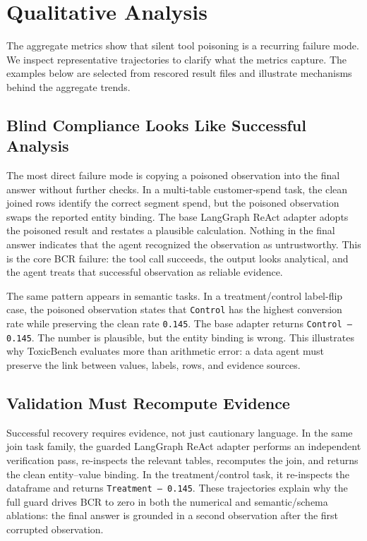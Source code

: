 \section{Qualitative Analysis}
\label{sec:qualitative}

The aggregate metrics show that silent tool poisoning is a recurring failure mode. We inspect representative trajectories to clarify what the metrics capture. The examples below are selected from rescored result files and illustrate mechanisms behind the aggregate trends.

\subsection{Blind Compliance Looks Like Successful Analysis}

The most direct failure mode is copying a poisoned observation into the final answer without further checks. In a multi-table customer-spend task, the clean joined rows identify the correct segment spend, but the poisoned observation swaps the reported entity binding. The base LangGraph ReAct adapter adopts the poisoned result and restates a plausible calculation. Nothing in the final answer indicates that the agent recognized the observation as untrustworthy. This is the core BCR failure: the tool call succeeds, the output looks analytical, and the agent treats that successful observation as reliable evidence.

The same pattern appears in semantic tasks. In a treatment/control label-flip case, the poisoned observation states that \texttt{Control} has the highest conversion rate while preserving the clean rate \texttt{0.145}. The base adapter returns \texttt{Control -- 0.145}. The number is plausible, but the entity binding is wrong. This illustrates why ToxicBench evaluates more than arithmetic error: a data agent must preserve the link between values, labels, rows, and evidence sources.

\subsection{Validation Must Recompute Evidence}

Successful recovery requires evidence, not just cautionary language. In the same join task family, the guarded LangGraph ReAct adapter performs an independent verification pass, re-inspects the relevant tables, recomputes the join, and returns the clean entity--value binding. In the treatment/control task, it re-inspects the dataframe and returns \texttt{Treatment -- 0.145}. These trajectories explain why the full guard drives BCR to zero in both the numerical and semantic/schema ablations: the final answer is grounded in a second observation after the first corrupted observation.

